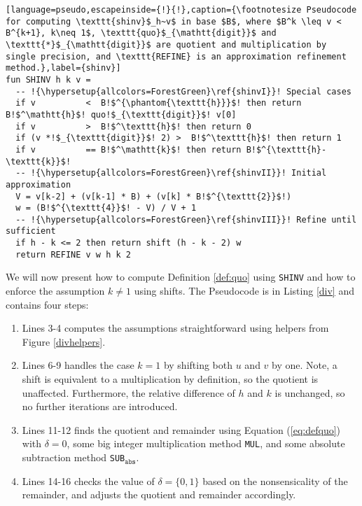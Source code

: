 \begin{lstlisting}[language=pseudo,escapeinside={!}{!},caption={\footnotesize Pseudocode for computing \texttt{shinv}$_h~v$ in base $B$, where $B^k \leq v < B^{k+1}, k\neq 1$, \texttt{quo}$_{\mathtt{digit}}$ and \texttt{*}$_{\mathtt{digit}}$ are quotient and multiplication by single precision, and \texttt{REFINE} is an approximation refinement method.},label={shinv}]
fun SHINV h k v =
  -- !{\hypersetup{allcolors=ForestGreen}\ref{shinvI}}! Special cases
  if v          <  B!$^{\phantom{\texttt{h}}}$! then return B!$^\mathtt{h}$! quo!$_{\texttt{digit}}$! v[0]
  if v          >  B!$^\texttt{h}$! then return 0
  if (v *!$_{\texttt{digit}}$! 2) >  B!$^\texttt{h}$! then return 1
  if v          == B!$^\mathtt{k}$! then return B!$^{\texttt{h}-\texttt{k}}$!
  -- !{\hypersetup{allcolors=ForestGreen}\ref{shinvII}}! Initial approximation
  V = v[k-2] + (v[k-1] * B) + (v[k] * B!$^{\texttt{2}}$!)
  w = (B!$^{\texttt{4}}$! - V) / V + 1
  -- !{\hypersetup{allcolors=ForestGreen}\ref{shinvIII}}! Refine until sufficient
  if h - k <= 2 then return shift (h - k - 2) w 
  return REFINE v w h k 2
\end{lstlisting}

We will now present how to compute Definition \ref{def:quo} using \texttt{SHINV}
and how to enforce the assumption $k\neq 1$ using shifts. The Pseudocode is in
Listing \ref{div} and contains four steps:
\begin{enumerate}
\item Lines 3-4 computes the assumptions straightforward using helpers from
  Figure \ref{divhelpers}.
\item Lines 6-9 handles the case $k=1$ by shifting both $u$ and $v$ by
  one. Note, a shift is equivalent to a multiplication by definition, so the
  quotient is unaffected. Furthermore, the relative difference of $h$ and $k$ is
  unchanged, so no further iterations are introduced.
\item Lines 11-12 finds the quotient and remainder using Equation
  (\ref{eq:defquo}) with $\delta=0$, some big integer multiplication method
  \texttt{MUL}, and some absolute subtraction method
  \texttt{SUB}$_{\mathtt{abs}}$.
\item Lines 14-16 checks the value of $\delta = \{0,1\}$ based on the nonsensicality
  of the remainder, and adjusts the quotient and remainder accordingly.
\end{enumerate}

